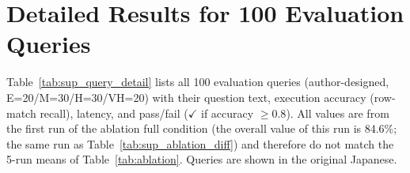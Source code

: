 
\section{Detailed Results for 100 Evaluation Queries}
\label{sec:sup_query_detail}

Table~\ref{tab:sup_query_detail} lists all 100 evaluation queries (author-designed, E=20/M=30/H=30/VH=20) with their question text, execution accuracy (row-match recall), latency, and pass/fail ($\checkmark$ if accuracy $\geq 0.8$). All values are from the first run of the ablation full condition (the overall value of this run is 84.6\%; the same run as Table~\ref{tab:sup_ablation_diff}) and therefore do not match the 5-run means of Table~\ref{tab:ablation}. Queries are shown in the original Japanese.
